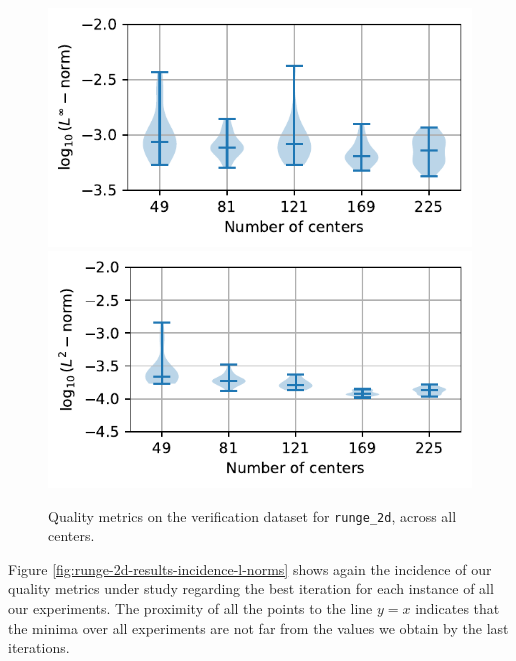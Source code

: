 \documentclass[12pt]{report} %
\begin{document}
\begin{figure}
  \includegraphics[width=.45\textwidth]{imagenes/experiments/2d/statistical_2d_full_scheduler_interpolation/runge_2d/violins_linf_runge_2d_endgame.pdf}
  \includegraphics[width=.45\textwidth]{imagenes/experiments/2d/statistical_2d_full_scheduler_interpolation/runge_2d/violins_l2_runge_2d_endgame.pdf}
  \caption{Quality metrics on the verification dataset for \texttt{runge\_2d}, across all centers.}
  \label{fig:violins-runge-2d}
\end{figure}

Figure \ref{fig:runge-2d-results-incidence-l-norms} shows again the incidence of our quality metrics under study regarding the best iteration for each instance of all our experiments. The proximity of all the points to the line $y=x$ indicates that the minima over all experiments are not far from the values we obtain by the last iterations. 
\end{document}
